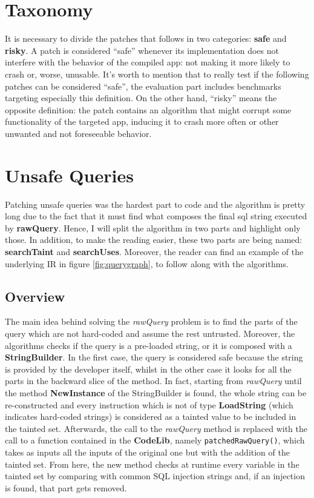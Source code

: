 \section{Taxonomy}
It is necessary to divide the patches that follows in two categories: \textbf{safe} and \textbf{risky}.
A patch is considered \enquote{safe} whenever its implementation does not interfere with the behavior of the compiled app: not making it more likely to crash or, worse, unusable. It's worth to mention that to really test if the following patches can be considered \enquote{safe}, the evaluation part includes benchmarks targeting especially this definition. On the other hand, \enquote{risky} means the opposite definition: the patch contains an algorithm that might corrupt some functionality of the targeted app, inducing it to crash more often or other unwanted and not foreseeable behavior.


\section{Unsafe Queries}

Patching unsafe queries was the hardest part to code and the algorithm is pretty long due to the fact that it must find what composes the final sql string executed by \textbf{rawQuery}. Hence, I will split the algorithm in two parts and highlight only those. In addition, to make the reading easier, these two parts are being named: \textbf{searchTaint} and \textbf{searchUses}. Moreover, the reader can find an example of the underlying IR in figure \ref{fig:querygraph}, to follow along with the algorithms.

\subsection{Overview}
The main idea behind solving the \emph{rawQuery} problem is to find the parts of the query which are not hard-coded and assume the rest untrusted. Moreover, the algorithms checks if the query is a pre-loaded string, or it is composed with a \textbf{StringBuilder}. In the first case, the query is considered safe because the string is provided by the developer itself, whilst in the other case it looks for all the parts in the backward slice of the method. In fact, starting from \emph{rawQuery} until the method \textbf{NewInstance} of the StringBuilder is found, the whole string can be re-constructed and every instruction which is not of type \textbf{LoadString} (which indicates hard-coded strings) is considered as a tainted value to be included in the tainted set.
Afterwards, the call to the \emph{rawQuery} method is replaced with the call to a function contained in the \textbf{CodeLib}, namely \texttt{patchedRawQuery()}, which takes as inputs all the inputs of the original one but with the addition of the tainted set. From here, the new method checks at runtime every variable in the tainted set by comparing with common SQL injection strings and, if an injection is found, that part gets removed.

